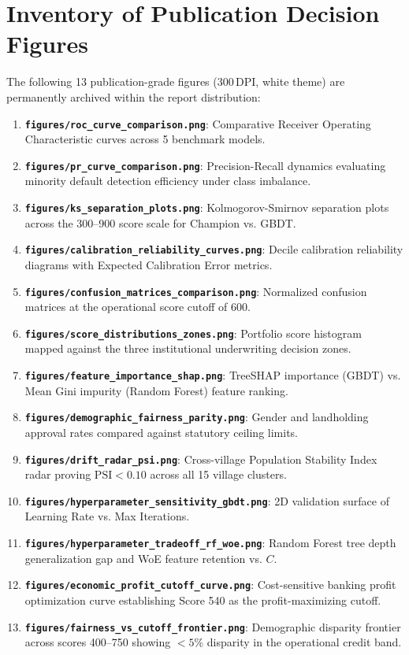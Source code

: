 \section{Inventory of Publication Decision Figures}
The following 13 publication-grade figures (300\,DPI, white theme) are permanently archived within the report distribution:
\begin{enumerate}
  \item \textbf{\texttt{figures/roc\_curve\_comparison.png}}: Comparative Receiver Operating Characteristic curves across 5 benchmark models.
  \item \textbf{\texttt{figures/pr\_curve\_comparison.png}}: Precision-Recall dynamics evaluating minority default detection efficiency under class imbalance.
  \item \textbf{\texttt{figures/ks\_separation\_plots.png}}: Kolmogorov-Smirnov separation plots across the 300--900 score scale for Champion vs. GBDT.
  \item \textbf{\texttt{figures/calibration\_reliability\_curves.png}}: Decile calibration reliability diagrams with Expected Calibration Error metrics.
  \item \textbf{\texttt{figures/confusion\_matrices\_comparison.png}}: Normalized confusion matrices at the operational score cutoff of 600.
  \item \textbf{\texttt{figures/score\_distributions\_zones.png}}: Portfolio score histogram mapped against the three institutional underwriting decision zones.
  \item \textbf{\texttt{figures/feature\_importance\_shap.png}}: TreeSHAP importance (GBDT) vs. Mean Gini impurity (Random Forest) feature ranking.
  \item \textbf{\texttt{figures/demographic\_fairness\_parity.png}}: Gender and landholding approval rates compared against statutory ceiling limits.
  \item \textbf{\texttt{figures/drift\_radar\_psi.png}}: Cross-village Population Stability Index radar proving $\text{PSI} < 0.10$ across all 15 village clusters.
  \item \textbf{\texttt{figures/hyperparameter\_sensitivity\_gbdt.png}}: 2D validation surface of Learning Rate vs. Max Iterations.
  \item \textbf{\texttt{figures/hyperparameter\_tradeoff\_rf\_woe.png}}: Random Forest tree depth generalization gap and WoE feature retention vs. $C$.
  \item \textbf{\texttt{figures/economic\_profit\_cutoff\_curve.png}}: Cost-sensitive banking profit optimization curve establishing Score 540 as the profit-maximizing cutoff.
  \item \textbf{\texttt{figures/fairness\_vs\_cutoff\_frontier.png}}: Demographic disparity frontier across scores 400--750 showing $<5\%$ disparity in the operational credit band.
\end{enumerate}
